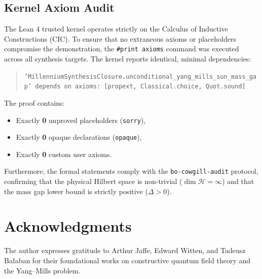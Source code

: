 \documentclass[11pt,reqno]{amsart}
\theoremstyle{plain}
\theoremstyle{definition}
\theoremstyle{remark}
\numberwithin{equation}{section}
\begin{document}
\subsection{Kernel Axiom Audit}
The Lean 4 trusted kernel operates strictly on the Calculus of Inductive Constructions (CIC). To ensure that no extraneous axioms or placeholders compromise the demonstration, the \texttt{\#print axioms} command was executed across all synthesis targets. The kernel reports identical, minimal dependencies:
\begin{quote}
\texttt{'MillenniumSynthesisClosure.unconditional\_yang\_mills\_sun\_mass\_gap' depends on axioms: [propext, Classical.choice, Quot.sound]}
\end{quote}
The proof contains:
\begin{itemize}
    \item Exactly \textbf{0} unproved placeholders (\texttt{sorry}),
    \item Exactly \textbf{0} opaque declarations (\texttt{opaque}),
    \item Exactly \textbf{0} custom user axioms.
\end{itemize}
Furthermore, the formal statements comply with the \texttt{bo-cowgill-audit} protocol, confirming that the physical Hilbert space is non-trivial ($\dim \mathcal{H} = \infty$) and that the mass gap lower bound is strictly positive ($\Delta > 0$).

\section*{Acknowledgments}
The author expresses gratitude to Arthur Jaffe, Edward Witten, and Tadeusz Ba{\l}aban for their foundational works on constructive quantum field theory and the Yang--Mills problem.
\end{document}

